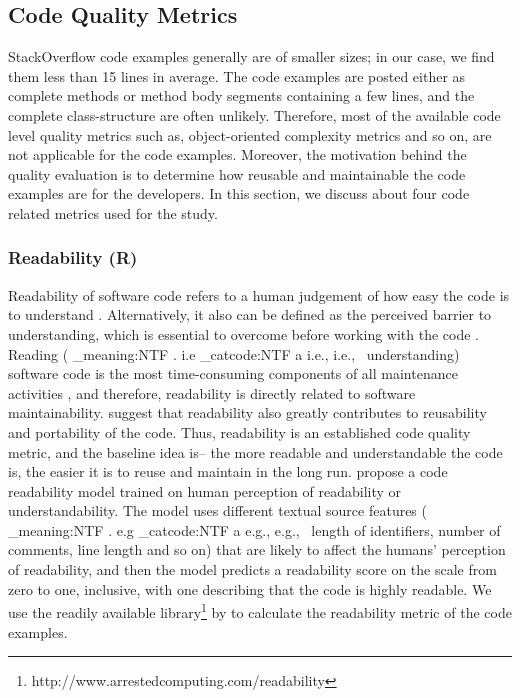 \documentclass{sig-alternate}
\makeatletter
\newcommand\latinabbrev[1]{
  \peek_meaning:NTF . {%
    #1\@}%
  { \peek_catcode:NTF a {%
      #1., \@ }%
    {#1., \@}}}
\def\eg{\latinabbrev{e.g}}
\def\ie{\latinabbrev{i.e}}
\makeatother
\begin{document}
\subsection{Code Quality Metrics}
\label{sec:metrics}
StackOverflow code examples generally are of smaller sizes; in our case, we find them less than 15 lines in average. The code examples are posted either as complete methods or method body segments containing a few lines, and the complete class-structure are often unlikely. Therefore, most of the available code level quality metrics such as, object-oriented complexity metrics and so on, are not applicable for the code examples. Moreover, the motivation behind the quality evaluation is to determine how reusable and maintainable the code examples are for the developers. In this section, we discuss about four code related metrics used for the study.
\subsubsection{Readability (R)}
Readability of software code refers to a human judgement of how easy the code is to understand \cite{readability}. Alternatively, it also can be defined as the perceived barrier to understanding, which is essential to overcome before working with the code \cite{simpler}. Reading (\ie\ understanding) software code is the most time-consuming components of all maintenance activities \cite{readability}, and therefore, readability is directly related to software maintainability. \citet{readuse} suggest that readability also greatly contributes to reusability and portability of the code. Thus, readability is an established code quality metric, and the baseline idea is-- the more readable and understandable the code is, the easier it is to reuse and maintain in the long run. \citet{readability} propose a code readability model trained on human perception of readability or understandability. The model uses different textual source features (\eg\ length of identifiers, number of comments, line length and so on) that are likely to affect the humans' perception of readability, and then the model predicts a readability score on the scale from zero to one, inclusive, with one describing that the code is highly readable. We use the readily available library\footnote{http://www.arrestedcomputing.com/readability} by \citet{readability} to calculate the readability metric of the code examples.
\end{document}
